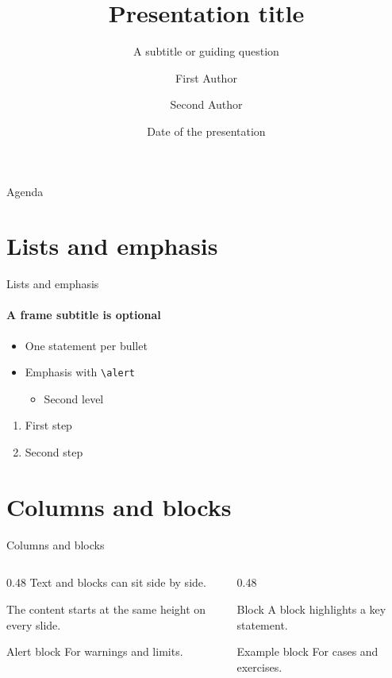 \documentclass[aspectratio=169, 11pt, english]{beamer}
\title{Presentation title}
\subtitle{A subtitle or guiding question}
\author{First Author \and Second Author}
\institute{Department or module, lecturer}
\date{Date of the presentation}
\begin{document}
\begin{frame}[plain]
  \titlepage
\end{frame}

\begin{frame}{Agenda}
  \tableofcontents
\end{frame}

\section{Lists and emphasis}

\begin{frame}{Lists and emphasis}
  \framesubtitle{A frame subtitle is optional}

  \begin{itemize}
    \item One statement per bullet
    \item \alert{Emphasis} with \texttt{\textbackslash alert}
    \begin{itemize}
      \item Second level
    \end{itemize}
  \end{itemize}

  \begin{enumerate}
    \item First step
    \item Second step
  \end{enumerate}
\end{frame}

\section{Columns and blocks}

\begin{frame}{Columns and blocks}
  \begin{columns}[T, onlytextwidth]
    \begin{column}{0.48\textwidth}
      Text and blocks can sit side by side.

      The content starts at the same height on every slide.

      \begin{alertblock}{Alert block}
        For warnings and limits.
      \end{alertblock}
    \end{column}
    \begin{column}{0.48\textwidth}
      \begin{block}{Block}
        A block highlights a key statement.
      \end{block}
      \begin{exampleblock}{Example block}
        For cases and exercises.
      \end{exampleblock}
    \end{column}
  \end{columns}
\end{frame}
\end{document}
